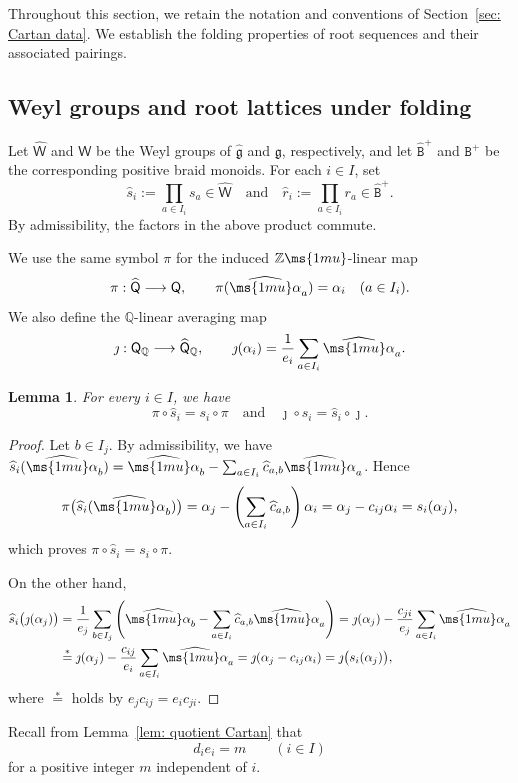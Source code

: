 \documentclass[12pt, leqno]{amsart}
\numberwithin{equation}{section}
\theoremstyle{plain}
\newtheorem{lemma}{Lemma}[section]
\theoremstyle{definition}
\newcommand{\g}{\mathfrak{g}}
\newcommand{\Q}{\mathbb{Q}}
\newcommand{\Z}{\mathbb{Z}\ms{1mu}}
\newcommand{\al}{{\ms{1mu}\alpha}}
\newcommand{\jm}{\jmath}
\newcommand{\hc}{\widehat{c}}
\newcommand{\hg}{{\widehat{\g}}}
\newcommand{\hs}{\widehat{s}}
\newcommand{\hr}{\widehat{r}}
\newcommand{\hal}{\widehat{\al}}
\newcommand{\sfQ}{\mathsf{Q}}
\newcommand{\sfW}{\mathsf{W}}
\newcommand{\hsfQ}{\widehat{\sfQ}}
\newcommand{\hsfW}{\widehat{\sfW}}
\newcommand{\ttB}{\mathtt{B}}
\newcommand{\httB}{\widehat{\ttB}}
\newcommand{\qtq}[1][{and}]{\quad\text{{#1}}\quad}
\begin{document}
Throughout this section, we retain the notation and conventions of
Section~\ref{sec: Cartan data}.
We establish the folding properties of root sequences and their associated pairings.

\subsection{Weyl groups and root lattices under folding}

Let $\hsfW$ and $\sfW$ be  the Weyl groups of $\hg$ and $\g$, respectively, and let
$\httB^+$ and $\ttB^+$ be the corresponding positive braid monoids.
For each $i\in I$, set
\[
\hs_i:=\prod_{a\in I_i}s_a\in\hsfW \qtq \hr_i:=\prod_{a\in I_i}r_a\in\httB^+.
\]
By admissibility, the factors in the above product commute.

We use the same symbol $\pi$ for the induced $\Z$-linear map
\[
\pi:\hsfQ\longrightarrow \sfQ, \qquad \pi(\hal_a)=\alpha_i \quad (a\in I_i).
\]
We also define the $\Q$-linear averaging map
\begin{align} \label{eq: averaging}
\jm:\sfQ_{\Q}\longrightarrow\hsfQ_{\Q}, \qquad \jmath(\alpha_i) = \frac{1}{e_i}\sum_{a\in I_i}\hal_a.
\end{align}

\begin{lemma}\label{lem: Weyl intertwining}
For every $i\in I$, we have
\[
\pi\circ\hs_i=s_i\circ\pi
\qtq
\jm\circ s_i=\hs_i\circ\jm.
\]
\end{lemma}

\begin{proof}
Let $b\in I_j$. By admissibility, we have
\( \hs_i(\hal_b) = \hal_b-\sum_{a\in I_i}\hc_{a,b}\hal_a \).
Hence
\[
\pi\bigl(\hs_i(\hal_b)\bigr)
= \alpha_j- \left(\sum_{a\in I_i}\hc_{a,b}\right)\alpha_i
= \alpha_j-c_{ij}\alpha_i
= s_i(\alpha_j),
\]
which proves $\pi\circ\hs_i=s_i\circ\pi$.

On the other hand,
\begin{align*}
\hs_i\bigl(\jm(\alpha_j)\bigr) &= \frac1{e_j}\sum_{b\in I_j} \left( \hal_b-\sum_{a\in I_i}\hc_{a,b}\hal_a \right)
=\jm(\alpha_j) -\frac{c_{ji}}{e_j}\sum_{a\in I_i}\hal_a \allowdisplaybreaks\\
&\overset{*}{=} \jm(\alpha_j) -\frac{c_{ij}}{e_i}\sum_{a\in I_i}\hal_a
= \jm(\alpha_j-c_{ij}\alpha_i) = \jm\bigl(s_i(\alpha_j)\bigr),
\end{align*}
where $\overset{*}{=}$ holds by $e_jc_{ij}=e_ic_{ji}$. \end{proof}

Recall from Lemma~\ref{lem: quotient Cartan} that
\[
d_i e_i=m\qquad(i\in I)
\]
for a positive integer $m$ independent of $i$.
\end{document}
